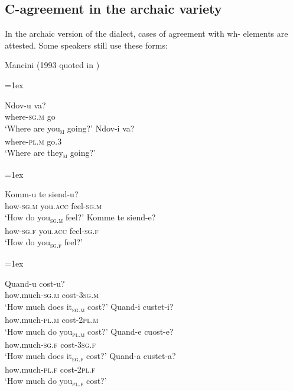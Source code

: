 \documentclass[output=paper
,modfonts
,nonflat]{langsci/langscibook}
\begin{document}
\subsection{C-agreement in the archaic variety}\label{sec-dalessandro:4.6}
In the archaic version of the dialect, cases of agreement with wh- elements are attested. Some speakers still use these forms:

\begin{exe} 
	\ex Mancini (1993 quoted in \citealt[4]{Ledgeway2006}) \xlist
	{\multicolsep=1ex\begin{multicols}{2}\ex 
	\gll Ndov-u   va?\\
	where-\textsc{sg.m} go\\
	\glt`Where are you\textsc{\textsubscript{m}} going?'
	\ex
	\gll   Ndov-i     va?\\
	where-\textsc{pl.m} go.3\\ 
	\glt `Where are they\textsc{\textsubscript{m}} going?'\end{multicols}}
	\endxlist
\end{exe}
\begin{exe} 
	\ex  \xlist
	{\multicolsep=1ex\begin{multicols}{2}\ex 
	\gll Komm-u   te     siend-u?\\
	how-\textsc{sg.m} you.\textsc{acc} feel-\textsc{sg.m}\\
	\glt `How do you\textsc{\textsubscript{sg.m}} feel?'
	\ex
	\gll Komme   te     siend-e? \\
	how-\textsc{sg.f} you.\textsc{acc} feel-\textsc{sg.f}\\ 
	\glt `How do you\textsc{\textsubscript{sg.f}} feel?'\end{multicols}}
	\endxlist
\end{exe}
\largerpage[-1]\pagebreak
\begin{exe} 
	\ex \citet[54]{Lambertelli2003} \xlist
	{\multicolsep=1ex\begin{multicols}{2}\ex 
	\gll Quand-u   cost-u?\\
	how.much-\textsc{sg.m}  cost-\textsc{3sg.m}\\
	\glt `How much does it\textsc{\textsubscript{sg.m}} cost?'
	\ex
	\gll Quand-i   custet-i? \\
	how.much-\textsc{pl.m}  cost-\textsc{2pl.m}\\ 
	\glt `How much do you\textsc{\textsubscript{pl.m}} cost?'
	\ex
	\gll Quand-e   cuost-e? \\
	how.much-\textsc{sg.f}  cost-\textsc{3sg.f}\\ 
	\glt `How much does it\textsc{\textsubscript{sg.f}} cost?'
	\ex
	\gll Quand-a   custet-a? \\
	how.much-\textsc{pl.f}  cost-\textsc{2pl.f}\\ 
	\glt `How much do you\textsc{\textsubscript{pl.f}} cost?'
	\end{multicols}}\endxlist
\end{exe}
\end{document}
